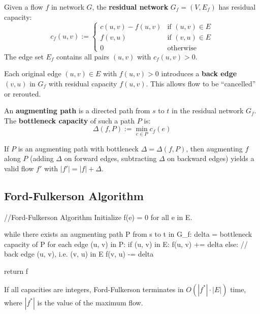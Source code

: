 \begin{definition}
	Given a flow $f$ in network $G$, the \textbf{residual network} $G_f = (V, E_f)$ has residual capacity:
	$$c_f(u, v) := \begin{cases} c(u,v) - f(u,v) & \text{if } (u,v) \in E \\ f(v,u) & \text{if } (v,u) \in E \\ 0 & \text{otherwise} \end{cases}$$
	The edge set $E_f$ contains all pairs $(u, v)$ with $c_f(u, v) > 0$.
\end{definition}

\begin{remark}
	Each original edge $(u, v) \in E$ with $f(u,v) > 0$ introduces a \textbf{back edge} $(v, u)$ in $G_f$ with residual capacity $f(u,v)$. This allows flow to be ``cancelled'' or rerouted.
\end{remark}

\begin{definition}
	An \textbf{augmenting path} is a directed path from $s$ to $t$ in the residual network $G_f$. The \textbf{bottleneck capacity} of such a path $P$ is:
	$$\Delta(f, P) := \min_{e \in P} c_f(e)$$
\end{definition}

\begin{lemma}
	If $P$ is an augmenting path with bottleneck $\Delta = \Delta(f, P)$, then augmenting $f$ along $P$ (adding $\Delta$ on forward edges, subtracting $\Delta$ on backward edges) yields a valid flow $f'$ with $|f'| = |f| + \Delta$.
\end{lemma}

\subsection{Ford-Fulkerson Algorithm}

\begin{algorithm}
	//Ford-Fulkerson Algorithm
	Initialize f(e) = 0 for all e in E.

	while there exists an augmenting path P from s to t in G_f:
	delta = bottleneck capacity of P
	for each edge (u, v) in P:
	if (u, v) in E:
	f(u, v) += delta
	else:    // back edge (u, v), i.e. (v, u) in E
	f(v, u) -= delta

	return f
\end{algorithm}

\begin{theorem}
	If all capacities are integers, Ford-Fulkerson terminates in $O(|f^*| \cdot |E|)$ time, where $|f^*|$ is the value of the maximum flow.
\end{theorem}

